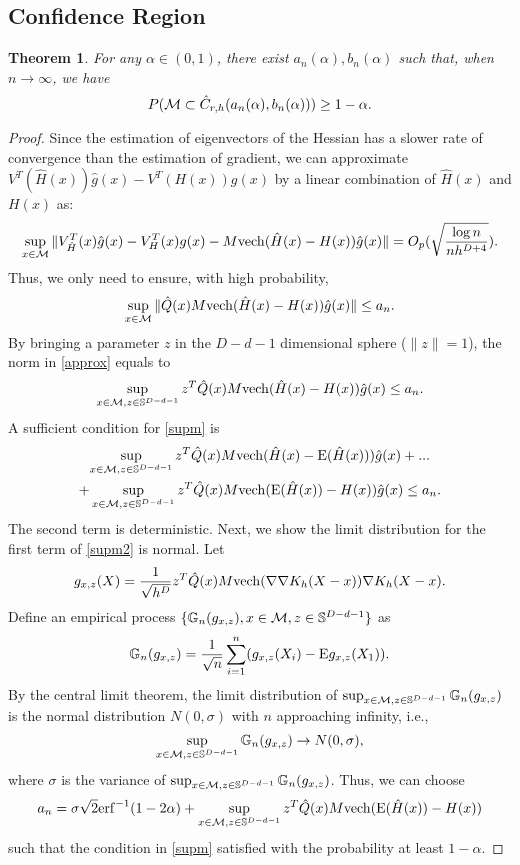 \documentclass[aos,preprint]{imsart}
\newtheorem{theorem}{Theorem}[section]
\theoremstyle{remark}
\begin{document}
\begin{appendix}
\subsection{Confidence Region}
\begin{theorem}\label{confidence}
For any $\alpha\in(0,1)$, there exist $a_n(\alpha), b_n(\alpha)$ such that, when $n\rightarrow \infty$, we have
\[
P({\cal M}\subset \hat{C}_{r,h}(a_n(\alpha), b_n(\alpha)) ) \geq 1-\alpha.
\]
\end{theorem}
\begin{proof}\label{confidence_region}
Since the estimation of eigenvectors of the Hessian has a slower rate of convergence than the estimation of gradient,
we can approximate $V^T({\hat{H}}(x))\hat{g}(x) -V^T(H(x))g(x)$ by a linear combination of $\hat{H}(x)$ and $H(x)$ as:
\[
\sup_{x\in \cal M} \|V^T_{\hat{H}}(x)\hat{g}(x) -V^T_H(x)g(x)-M {\rm vech}(\hat{H}(x)-H(x))\hat{g}(x)\| = O_p(\sqrt{\frac{\log n}{nh^{D+4}}}).
\]
Thus, we only need to ensure, with high probability,
\begin{equation}\label{approx}
\sup_{x\in\cal M}\|\hat{Q}(x)M {\rm vech}(\hat{H}(x)- H(x))\hat{g}(x)\|\leq a_n.
\end{equation}
By bringing a parameter $z$ in the $D-d-1$ dimensional sphere ($\|z\|=1$), the norm in \eqref{approx} equals to 
\begin{equation}\label{supm}
\sup_{x\in{\cal M}, z\in {\mathbb S}^{D-d-1}} z^T\hat{Q}(x)M {\rm vech}(\hat{H}(x)- H(x))\hat{g}(x) \leq a_n.
\end{equation}
A sufficient condition for \eqref{supm} is
\begin{multline}\label{supm2}
\sup_{x\in{\cal M}, z\in {\mathbb S}^{D-d-1}} z^T\hat{Q}(x)M {\rm vech}(\hat{H}(x)- {\rm E}(\hat{H}(x)))\hat{g}(x)+...\\
+\sup_{x\in{\cal M}, z\in {\mathbb S}^{D-d-1}} z^T\hat{Q}(x)M {\rm vech}({\rm E}(\hat{H}(x)) - H(x))\hat{g}(x) \leq a_n.
\end{multline}
The second term is deterministic. Next, we show the limit distribution for the first term of \eqref{supm2} is normal. Let 
\[
g_{x,z}(X) = \frac{1}{\sqrt{h^D}} z^T\hat{Q}(x)M {\rm vech}( \nabla\nabla K_h(X-x))\nabla K_h(X-x).
\]
Define an  empirical process $\{{\mathbb G}_n(g_{x,z}), x\in {\cal M}, z\in {\mathbb S}^{D-d-1}\}$ as
\[
{\mathbb G}_n(g_{x,z}) = \frac{1}{\sqrt{n}} \sum_{i=1}^n (g_{x,z}(X_i)-{\rm E}g_{x,z}(X_1)).
\]
By the central limit theorem, the limit distribution of $\sup_{x\in {\cal M},{z \in {\mathbb S}^{D-d-1}}}{\mathbb G}_n(g_{x,z})$ is the normal distribution $N(0,\sigma)$ with $n$ approaching infinity, i.e.,  
\[
\sup_{x\in {\cal M},{z \in {\mathbb S}^{D-d-1}}}{\mathbb G}_n(g_{x,z}) \rightarrow N(0,\sigma),
\]
where $\sigma$ is the variance of $\sup_{x\in {\cal M},{z \in {\mathbb S}^{D-d-1}}}{\mathbb G}_n(g_{x,z})$.
Thus,  we can choose 
\[
a_n = \sigma\sqrt{2}{\rm erf}^{-1}(1-2\alpha) + \sup_{x\in{\cal M}, z\in {\mathbb S}^{D-d-1}} z^T\hat{Q}(x)M {\rm vech}({\rm E}(\hat{H}(x)) - H(x)) 
\]
such that the condition in \eqref{supm} satisfied with the probability at least $1-\alpha$.
\end{proof}


\end{appendix}
\end{document}

